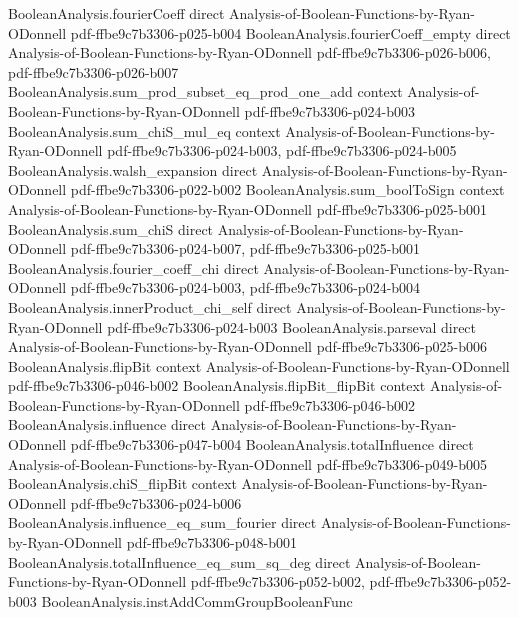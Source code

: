 \begin{lemma}
\proofstep
  {BooleanAnalysis.fourierCoeff}
  {direct}
  {Analysis-of-Boolean-Functions-by-Ryan-ODonnell}
  {pdf-ffbe9c7b3306-p025-b004}
\proofstep
  {BooleanAnalysis.fourierCoeff_empty}
  {direct}
  {Analysis-of-Boolean-Functions-by-Ryan-ODonnell}
  {pdf-ffbe9c7b3306-p026-b006,
    pdf-ffbe9c7b3306-p026-b007}
\proofstep
  {BooleanAnalysis.sum_prod_subset_eq_prod_one_add}
  {context}
  {Analysis-of-Boolean-Functions-by-Ryan-ODonnell}
  {pdf-ffbe9c7b3306-p024-b003}
\proofstep
  {BooleanAnalysis.sum_chiS_mul_eq}
  {context}
  {Analysis-of-Boolean-Functions-by-Ryan-ODonnell}
  {pdf-ffbe9c7b3306-p024-b003,
    pdf-ffbe9c7b3306-p024-b005}
\proofstep
  {BooleanAnalysis.walsh_expansion}
  {direct}
  {Analysis-of-Boolean-Functions-by-Ryan-ODonnell}
  {pdf-ffbe9c7b3306-p022-b002}
\proofstep
  {BooleanAnalysis.sum_boolToSign}
  {context}
  {Analysis-of-Boolean-Functions-by-Ryan-ODonnell}
  {pdf-ffbe9c7b3306-p025-b001}
\proofstep
  {BooleanAnalysis.sum_chiS}
  {direct}
  {Analysis-of-Boolean-Functions-by-Ryan-ODonnell}
  {pdf-ffbe9c7b3306-p024-b007,
    pdf-ffbe9c7b3306-p025-b001}
\proofstep
  {BooleanAnalysis.fourier_coeff_chi}
  {direct}
  {Analysis-of-Boolean-Functions-by-Ryan-ODonnell}
  {pdf-ffbe9c7b3306-p024-b003,
    pdf-ffbe9c7b3306-p024-b004}
\proofstep
  {BooleanAnalysis.innerProduct_chi_self}
  {direct}
  {Analysis-of-Boolean-Functions-by-Ryan-ODonnell}
  {pdf-ffbe9c7b3306-p024-b003}
\proofstep
  {BooleanAnalysis.parseval}
  {direct}
  {Analysis-of-Boolean-Functions-by-Ryan-ODonnell}
  {pdf-ffbe9c7b3306-p025-b006}
\proofstep
  {BooleanAnalysis.flipBit}
  {context}
  {Analysis-of-Boolean-Functions-by-Ryan-ODonnell}
  {pdf-ffbe9c7b3306-p046-b002}
\proofstep
  {BooleanAnalysis.flipBit_flipBit}
  {context}
  {Analysis-of-Boolean-Functions-by-Ryan-ODonnell}
  {pdf-ffbe9c7b3306-p046-b002}
\proofstep
  {BooleanAnalysis.influence}
  {direct}
  {Analysis-of-Boolean-Functions-by-Ryan-ODonnell}
  {pdf-ffbe9c7b3306-p047-b004}
\proofstep
  {BooleanAnalysis.totalInfluence}
  {direct}
  {Analysis-of-Boolean-Functions-by-Ryan-ODonnell}
  {pdf-ffbe9c7b3306-p049-b005}
\proofstep
  {BooleanAnalysis.chiS_flipBit}
  {context}
  {Analysis-of-Boolean-Functions-by-Ryan-ODonnell}
  {pdf-ffbe9c7b3306-p024-b006}
\proofstep
  {BooleanAnalysis.influence_eq_sum_fourier}
  {direct}
  {Analysis-of-Boolean-Functions-by-Ryan-ODonnell}
  {pdf-ffbe9c7b3306-p048-b001}
\proofstep
  {BooleanAnalysis.totalInfluence_eq_sum_sq_deg}
  {direct}
  {Analysis-of-Boolean-Functions-by-Ryan-ODonnell}
  {pdf-ffbe9c7b3306-p052-b002,
    pdf-ffbe9c7b3306-p052-b003}
\proofstep
  {BooleanAnalysis.instAddCommGroupBooleanFunc}

\end{lemma}
